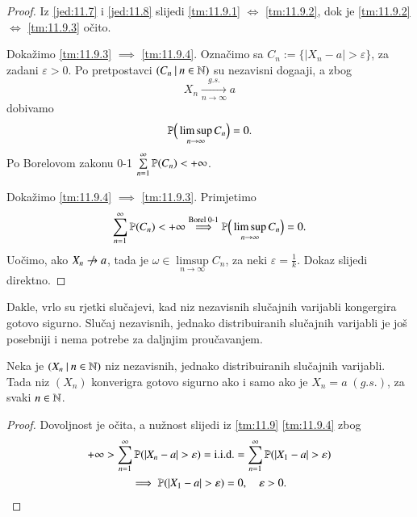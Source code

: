 \begin{proof}
    Iz \eqref{jed:11.7} i \eqref{jed:11.8} slijedi \ref{tm:11.9.1} $\iff$ \ref{tm:11.9.2}, dok je \ref{tm:11.9.2} $\iff$ \ref{tm:11.9.3} o\v cito.

    Doka\v zimo \ref{tm:11.9.3} $\implies$ \ref{tm:11.9.4}.
    Ozna\v cimo sa $C_n := \{ |X_n - a| > \varepsilon\}$, za zadani $\varepsilon > 0$.
    Po pretpostavci $({C_n} \: | \: {n \in \mathbb{N}})$ su nezavisni doga\dj aji, a zbog
    \begin{equation*}
        X_n \xrightarrow[n \to \infty]{g.s.} a
    \end{equation*}
    dobivamo
    \begin{equation*}
        \mathbb{P} \Big( \limsup\limits_{n \to \infty} C_n \Big) = 0.
    \end{equation*}
    Po Borelovom zakonu 0-1 $\sum\limits_{n = 1}^{\infty} \mathbb{P}({C_n}) < +\infty$.

    Doka\v zimo \ref{tm:11.9.4} $\implies$ \ref{tm:11.9.3}.
    Primjetimo
    \begin{equation*}
        \sum\limits_{n = 1}^{\infty} \mathbb{P}({C_n}) < +\infty \overset{\textnormal{Borel 0-1}}{\implies} \mathbb{P} \Big( \limsup\limits_{n \to \infty} C_n \Big) = 0.
    \end{equation*}
    Uo\v cimo, ako $X_n \centernot{\to} a$, tada je $\omega \in \limsup\limits_{n \to \infty} C_n$, za neki $\varepsilon = \frac{1}{k}$.
    Dokaz slijedi direktno.
\end{proof}

Dakle, vrlo su rjetki slu\v cajevi, kad niz nezavisnih slu\v cajnih varijabli kongergira gotovo sigurno.
Slu\v caj nezavisnih, jednako distribuiranih slu\v cajnih varijabli je jo\v s posebniji i nema potrebe za daljnjim prou\v cavanjem.

\begin{kor} \label{kor:11.10}
    Neka je $({X_n} \: | \: {n \in \mathbb{N}})$ niz nezavisnih, jednako distribuiranih slu\v cajnih varijabli.
    Tada niz $(X_n)$ konverigra gotovo sigurno ako i samo ako je $X_n = a \; (g.s.)$, za svaki $n \in \mathbb{N}$.
\end{kor}

\begin{proof}
    Dovoljnost je o\v cita, a nu\v znost slijedi iz \ref{tm:11.9} \ref{tm:11.9.4} zbog
    \begin{equation*}
        \begin{gathered}
            +\infty > \suma{n = 1}{\infty} \vjeroj{|X_n - a|>\varepsilon} = \iid = \suma{n = 1}{\infty} \vjeroj{|X_1 - a|> \varepsilon}\\
            \implies \vjeroj{|X_1 - a| > \varepsilon} = 0, \quad \varepsilon > 0.
        \end{gathered}
    \end{equation*}
\end{proof}

